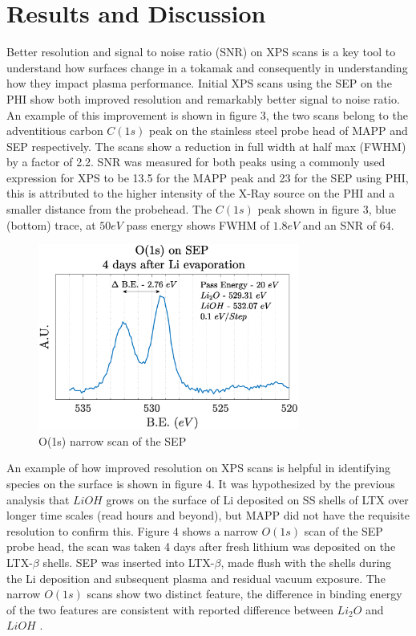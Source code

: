 \documentclass[%
 aip,
 amsmath,amssymb,
 reprint,%
]{revtex4-1}
\begin{document}
\section{Results and Discussion}

Better resolution and signal to noise ratio (SNR) on XPS scans is a key tool to understand how surfaces change in a tokamak and consequently in understanding how they impact plasma performance. Initial XPS scans using the SEP on the PHI show both improved resolution and remarkably better signal to noise ratio. An example of this improvement is shown in figure 3, the two scans belong to the adventitious carbon $C(1s)$ peak on the stainless steel probe head of MAPP and SEP respectively. The scans show a reduction in full width at half max (FWHM) by a factor of 2.2. SNR was measured for both peaks using a commonly used expression for XPS \cite{xps_snr} to be 13.5 for the MAPP peak and 23 for the SEP using PHI, this is attributed to the higher intensity of the X-Ray source on the PHI and a smaller distance from the probehead. The $C(1s)$ peak shown in figure 3, blue (bottom) trace, at $50 eV$ pass energy shows FWHM of $1.8eV$ and an SNR of 64. 

\begin{figure}%
\centering
\includegraphics[width=3.37in,keepaspectratio]{O1s_20eV}%
\caption{O(1s) narrow scan of the SEP }
\end{figure}

An example of how improved resolution on XPS scans is helpful in identifying species on the surface is shown in figure 4. It was hypothesized by the previous analysis that $LiOH$ grows on the surface of Li deposited on SS shells of LTX over longer time scales (read hours and beyond), but MAPP did not have the requisite resolution to confirm this. Figure 4 shows a narrow $O(1s)$ scan of the SEP probe head, the scan was taken 4 days after fresh lithium was deposited on the LTX-$\beta$ shells. SEP was inserted into LTX-$\beta$, made flush with the shells during the Li deposition and subsequent plasma and residual vacuum exposure. The narrow $O(1s)$ scans show two distinct feature, the difference in binding energy of the two features are consistent with reported difference between $Li_2O$ and $LiOH$ \cite{o1s_delta}. 
\end{document}
